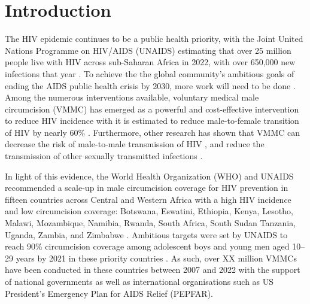 \documentclass{article}
\begin{document}
\newpage



\section{Introduction}


The HIV epidemic continues to be a public health priority, with the Joint United Nations Programme on HIV/AIDS (UNAIDS) estimating that over 25 million people live with HIV across sub-Saharan Africa in 2022, with over 650,000 new infections that year \cite{UNAIDSStats}. To achieve the the global community's ambitious goals of ending the AIDS public health crisis by 2030, more work will need to be done \cite{UNAIDSStrategy}. Among the numerous interventions available, voluntary medical male circumcision (VMMC) has emerged as a powerful and cost-effective intervention to reduce HIV incidence \cite{bansi2023cost} with it is estimated to reduce male-to-female transition of HIV by nearly 60\% \cite{gray2007male, bailey2007male, auvert2005randomized, gray2012effectiveness, grund2017association}. Furthermore, other research has shown that VMMC can decrease the risk of male-to-male transmission of HIV \cite{pintye2019benefits}, and reduce the transmission of other sexually transmitted infections \cite{tobian2009male}. 

In light of this evidence, the World Health Organization (WHO) and UNAIDS recommended a scale-up in male circumcision coverage for HIV prevention in fifteen countries across Central and Western Africa with a high HIV incidence and low circumcision coverage: Botswana, Eswatini, Ethiopia, Kenya, Lesotho, Malawi, Mozambique, Namibia, Rwanda, South Africa, South Sudan Tanzania, Uganda, Zambia, and Zimbabwe \cite{UNAIDSJoint, davis2018progress, WHOVoluntary2}. Ambitious targets were set by UNAIDS to reach 90\% circumcision coverage among adolescent boys and young men aged 10--29 years by 2021 in these priority countries \cite{WHOFramework}. As such, over XX million VMMCs have been conducted in these countries between 2007 and 2022 with the support of national governments as well as international organisations such as US President’s Emergency Plan for AIDS Relief (PEPFAR). 
\end{document}
